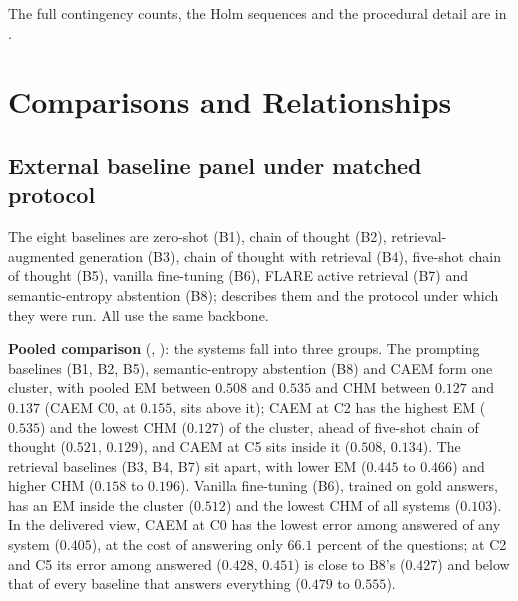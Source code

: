 The full contingency counts, the Holm sequences and the procedural detail are in .

\section{Comparisons and Relationships}
\label{sec:comparisons}

\subsection{External baseline panel under matched protocol}
\label{sec:comp-baselines}

The eight baselines are zero-shot (B1), chain of thought (B2), retrieval-augmented generation (B3), chain of thought with retrieval (B4), five-shot chain of thought (B5), vanilla fine-tuning (B6), FLARE active retrieval (B7) and semantic-entropy abstention (B8);  describes them and  the protocol under which they were run. All use the same backbone.

\textbf{Pooled comparison} (, ): the systems fall into three groups. The prompting baselines (B1, B2, B5), semantic-entropy abstention (B8) and CAEM form one cluster, with pooled EM between $0.508$ and $0.535$ and CHM between $0.127$ and $0.137$ (CAEM C0, at $0.155$, sits above it); CAEM at C2 has the highest EM ($0.535$) and the lowest CHM ($0.127$) of the cluster, ahead of five-shot chain of thought ($0.521$, $0.129$), and CAEM at C5 sits inside it ($0.508$, $0.134$). The retrieval baselines (B3, B4, B7) sit apart, with lower EM ($0.445$ to $0.466$) and higher CHM ($0.158$ to $0.196$). Vanilla fine-tuning (B6), trained on gold answers, has an EM inside the cluster ($0.512$) and the lowest CHM of all systems ($0.103$). In the delivered view, CAEM at C0 has the lowest error among answered of any system ($0.405$), at the cost of answering only $66.1$ percent of the questions; at C2 and C5 its error among answered ($0.428$, $0.451$) is close to B8's ($0.427$) and below that of every baseline that answers everything ($0.479$ to $0.555$).

